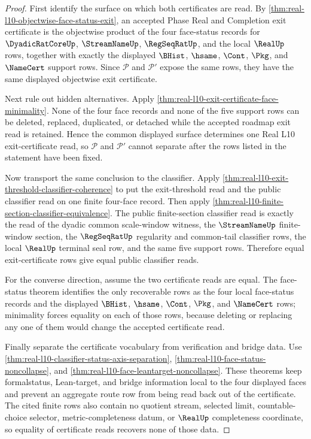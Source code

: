 \begin{proof}
First identify the surface on which both certificates are read. By \autoref{thm:real-l10-objectwise-face-status-exit}, an accepted Phase Real and Completion exit certificate is the objectwise product of the four face-status records for $\DyadicRatCoreUp$, $\StreamNameUp$, $\RegSeqRatUp$, and the local $\RealUp$ rows, together with exactly the displayed $\BHist$, $\hsame$, $\Cont$, $\Pkg$, and $\NameCert$ support rows. Since $\mathcal P$ and $\mathcal P'$ expose the same rows, they have the same displayed objectwise exit certificate.

Next rule out hidden alternatives. Apply \autoref{thm:real-l10-exit-certificate-face-minimality}. None of the four face records and none of the five support rows can be deleted, replaced, duplicated, or detached while the accepted roadmap exit read is retained. Hence the common displayed surface determines one Real L10 exit-certificate read, so $\mathcal P$ and $\mathcal P'$ cannot separate after the rows listed in the statement have been fixed.

Now transport the same conclusion to the classifier. Apply \autoref{thm:real-l10-exit-threshold-classifier-coherence} to put the exit-threshold read and the public classifier read on one finite four-face record. Then apply \autoref{thm:real-l10-finite-section-classifier-equivalence}. The public finite-section classifier read is exactly the read of the dyadic common scale-window witness, the $\StreamNameUp$ finite-window section, the $\RegSeqRatUp$ regularity and common-tail classifier rows, the local $\RealUp$ terminal seal row, and the same five support rows. Therefore equal exit-certificate rows give equal public classifier reads.

For the converse direction, assume the two certificate reads are equal. The face-status theorem identifies the only recoverable rows as the four local face-status records and the displayed $\BHist$, $\hsame$, $\Cont$, $\Pkg$, and $\NameCert$ rows; minimality forces equality on each of those rows, because deleting or replacing any one of them would change the accepted certificate read.

Finally separate the certificate vocabulary from verification and bridge data. Use \autoref{thm:real-l10-classifier-status-axis-separation}, \autoref{thm:real-l10-face-status-noncollapse}, and \autoref{thm:real-l10-face-leantarget-noncollapse}. These theorems keep formalstatus, Lean-target, and bridge information local to the four displayed faces and prevent an aggregate route row from being read back out of the certificate. The cited finite rows also contain no quotient stream, selected limit, countable-choice selector, metric-completeness datum, or $\RealUp$ completeness coordinate, so equality of certificate reads recovers none of those data.
\end{proof}

